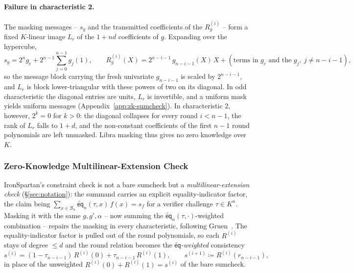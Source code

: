 \documentclass{article}
\theoremstyle{definition}
\newcommand*{\mle}{\widetilde}
\newcommand{\eq}{\mathsf{eq}}
\newcommand{\BB}{\mathcal{B}}
\begin{document}
\paragraph{Failure in characteristic 2.}
The masking messages -- $s_g$ and the transmitted coefficients of the $R_g^{(i)}$ -- form a fixed $K$-linear image $L_r$ of the $1 + nd$ coefficients of $g$. Expanding over the hypercube,
\[
  s_g = 2^n g_c + 2^{n - 1} \sum_{j = 0}^{n - 1} g_j(1), \qquad R_g^{(i)}(X) = 2^{n - i - 1}\, g_{n - i - 1}(X)\, X + (\text{terms in } g_c \text{ and the } g_j,\ j \neq n - i - 1),
\]
so the message block carrying the fresh univariate $g_{n - i - 1}$ is scaled by $2^{n - i - 1}$, and $L_r$ is block lower-triangular with these powers of two on its diagonal. In odd characteristic the diagonal entries are units, $L_r$ is invertible, and a uniform mask yields uniform messages (Appendix~\ref{app:zk-sumcheck}). In characteristic $2$, however, $2^k = 0$ for $k > 0$: the diagonal collapses for every round $i < n - 1$, the rank of $L_r$ falls to $1 + d$, and the non-constant coefficients of the first $n - 1$ round polynomials are left unmasked. Libra masking thus gives no zero knowledge over $K$.

\subsubsection{Zero-Knowledge Multilinear-Extension Check}
\label{sec:zk-mle-check}

IronSpartan's constraint check is not a bare sumcheck but a \emph{multilinear-extension check} (\S\ref{sec:notation}): the summand carries an explicit equality-indicator factor, the claim being $\sum_{x \in \BB_n} \mle{\eq}_n(\tau, x)\, f(x) = s_f$ for a verifier challenge $\tau \in K^n$. Masking it with the same $g, g', \alpha$ -- now summing the $\mle{\eq}_n(\tau, \cdot)$-weighted combination -- repairs the masking in every characteristic, following Gruen~\cite{Gruen:2024aa}. The equality-indicator factor is pulled out of the round polynomials, so each $R^{(i)}$ stays of degree $\le d$ and the round relation becomes the \emph{$\mle{\eq}$-weighted} consistency
\[
  s^{(i)} = (1 - \tau_{n - i - 1})\, R^{(i)}(0) + \tau_{n - i - 1}\, R^{(i)}(1), \qquad s^{(i + 1)} \coloneqq R^{(i)}(r_{n - i - 1}),
\]
in place of the unweighted $R^{(i)}(0) + R^{(i)}(1) = s^{(i)}$ of the bare sumcheck.
\end{document}
